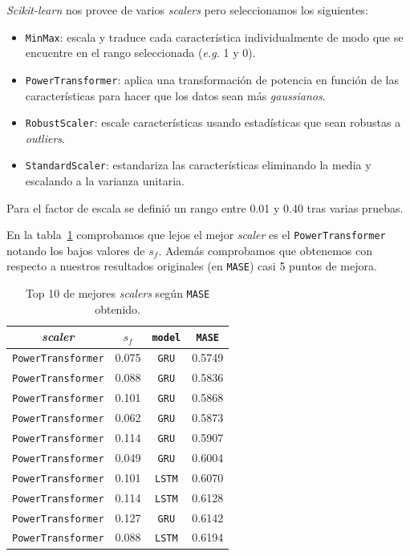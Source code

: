 \documentclass[a4paper,12pt]{article}
\begin{document}
\textit{Scikit-learn} nos provee de varios \textit{scalers} pero seleccionamos los siguientes:
\begin{itemize}
	\item \texttt{MinMax}: escala y traduce cada característica individualmente de modo que se encuentre en el rango seleccionada (\textit{e.g.} 1 y 0).
	\item \texttt{PowerTransformer}: aplica una transformación de potencia en función de las características para hacer que los datos sean más \textit{gaussianos}.
	\item \texttt{RobustScaler}: escale características usando estadísticas que sean robustas a \textit{outliers}.
	\item \texttt{StandardScaler}: estandariza las características eliminando la media y escalando a la varianza unitaria.
\end{itemize}

Para el factor de escala se definió un rango entre 0.01 y 0.40 tras varias pruebas.

En la tabla~\ref{tab:scalers-table} comprobamos que lejos el mejor \textit{scaler} es el \texttt{PowerTransformer} notando los bajos valores de $s_f$. Además comprobamos que obtenemos con respecto a nuestros resultados originales (en \texttt{MASE}) casi 5 puntos de mejora.

\begin{table}[H]
\centering
\begin{tabular}{lccc}
\hline
\multicolumn{1}{c}{\textit{scaler}} & $s_f$ & \texttt{model} & \texttt{MASE} \\ \hline
\texttt{PowerTransformer}                    & 0.075      & \texttt{GRU}            & 0.5749        \\
\texttt{PowerTransformer}                    & 0.088      & \texttt{GRU}            & 0.5836        \\
\texttt{PowerTransformer}                    & 0.101      & \texttt{GRU}            & 0.5868        \\
\texttt{PowerTransformer}                    & 0.062      & \texttt{GRU}            & 0.5873        \\
\texttt{PowerTransformer}                    & 0.114      & \texttt{GRU}            & 0.5907        \\
\texttt{PowerTransformer}                    & 0.049      & \texttt{GRU}            & 0.6004        \\
\texttt{PowerTransformer}                    & 0.101      & \texttt{LSTM}           & 0.6070        \\
\texttt{PowerTransformer}                    & 0.114      & \texttt{LSTM}           & 0.6128        \\
\texttt{PowerTransformer}                    & 0.127      & \texttt{GRU}            & 0.6142        \\
\texttt{PowerTransformer}                    & 0.088      & \texttt{LSTM}           & 0.6194        \\ \hline
\end{tabular}
\caption{Top 10 de mejores \textit{scalers} según \texttt{MASE} obtenido.}
\label{tab:scalers-table}
\end{table}
\end{document}
